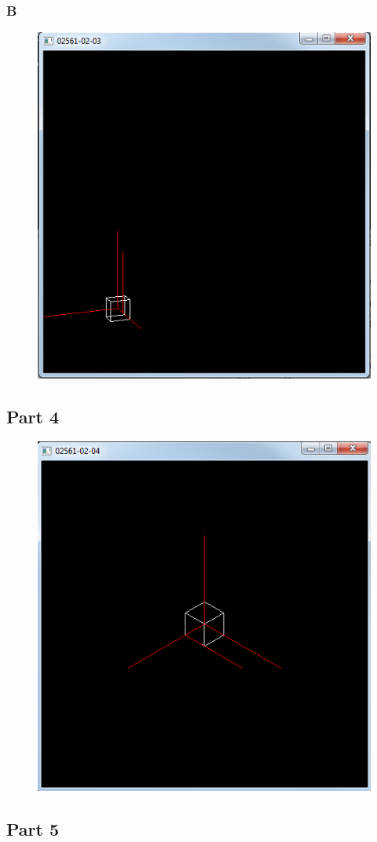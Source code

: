 \documentclass[11pt]{article}
\begin{document}
\subsubsection{B}
\begin{figure}[H]
	\centering
	\includegraphics[width=0.5\linewidth]{images/e02p3b}
	\label{fig:e02p3b}
\end{figure}

\subsection{Part 4}
\begin{figure}[H]
	\centering
	\includegraphics[width=0.5\linewidth]{images/e02p4}
	\label{fig:e02p4}
\end{figure}

\subsection{Part 5}
\end{document}
